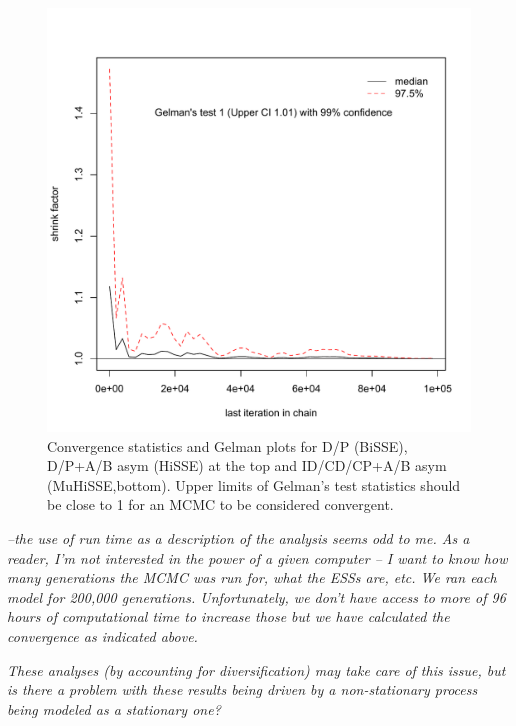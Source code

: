 \documentclass[11pt]{article}
\renewenvironment{quote}{\bigskip\noindent\itshape\ignorespaces}{\smallskip}
\begin{document}
\begin{figure}
\begin{minipage}[b]{0.33\textwidth}
        \end{minipage}
    \begin{minipage}[b]{0.33\textwidth}
             \includegraphics[width=\textwidth]{Gelmanmuhissenodipasym.pdf}
                 \end{minipage}
    \caption{ Convergence statistics and Gelman plots for D/P (BiSSE), D/P+A/B asym (HiSSE) at the top and ID/CD/CP+A/B asym (MuHiSSE,bottom). Upper limits of Gelman's test statistics should be close to 1 for an MCMC to be considered convergent.}
    \label{figure:convergencestats}
\end{figure}


\begin{quote}
--the use of run time as a description of the analysis seems odd to me.
As a reader, I'm not interested in the power of a given computer -- I want to know how many generations the MCMC was run for, what the ESSs are, etc.
\end{quote}
We ran each model for 200,000 generations. Unfortunately, we don't have access to more of 96 hours of computational time to increase those but we have calculated the convergence as indicated above.

\begin{quote}
-325  These analyses (by accounting for diversification) may take care of this issue, but is there a problem with these results being driven by a non-stationary process being modeled as a stationary one?
\end{quote}
\end{document}
